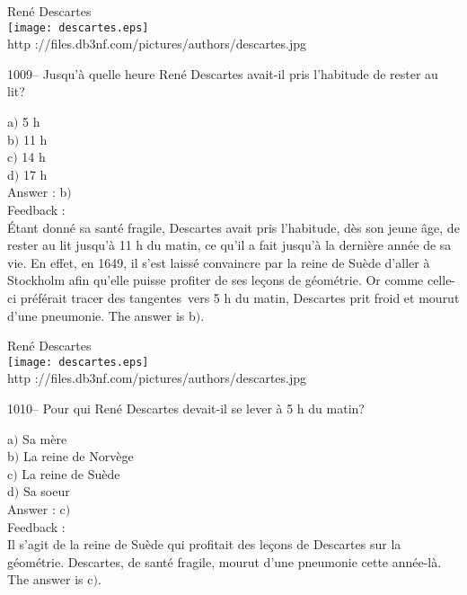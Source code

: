 ﻿\documentclass[letterpaper, 12pt]{article}
\begin{document}
        \begin{center}
        Ren\'e Descartes\\
    \texttt{[image: descartes.eps]}\\
        {\footnotesize http
://files.db3nf.com/pictures/authors/descartes.jpg}
    \end{center}

1009-- Jusqu'\`a quelle heure Ren\'e Descartes avait-il pris
l'habitude de rester au lit?

a$)$ 5 h \\
b$)$ 11 h \\
c$)$ 14 h \\
d$)$ 17 h\\

Answer : b$)$\\

Feedback :\\
\'Etant donn\'e sa sant\'e fragile, Descartes avait pris l'habitude,
d\`es son jeune \^age, de rester au lit jusqu'\`a 11 h du matin, ce
qu'il a fait jusqu'\`a la derni\`ere ann\'ee de sa vie.  En effet,
en 1649, il s'est laiss\'e convaincre par la reine de Su\`ede
d'aller \`a Stockholm afin qu'elle puisse profiter de ses le\c cons
de g\'eom\'etrie.  Or comme celle-ci pr\'ef\'erait \og tracer des
tangentes\fg\ vers 5 h du matin, Descartes prit froid et mourut
d'une pneumonie.
The answer is b$)$.\\

        \begin{center}
        Ren\'e Descartes\\
    \texttt{[image: descartes.eps]}\\
        {\footnotesize http
://files.db3nf.com/pictures/authors/descartes.jpg}
    \end{center}

1010-- Pour qui Ren\'e Descartes devait-il se lever \`a 5 h du
matin?

a$)$ Sa m\`ere \\
b$)$ La reine de Norv\`ege \\
c$)$ La reine de Su\`ede \\
d$)$ Sa soeur\\

Answer : c$)$\\

Feedback : \\
Il s'agit de la reine de Su\`ede qui profitait des le\c cons de
Descartes sur la g\'eom\'etrie. Descartes, de sant\'e fragile,
mourut d'une pneumonie cette ann\'ee-l\`a.
The answer is c$)$.\\
\end{document}
